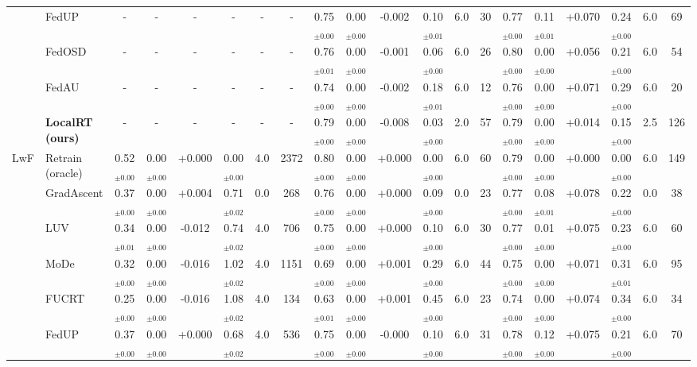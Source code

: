 \begin{table}[t]
\begin{tabular}{ll|cccccc|cccccc|cccccc}
 & FedUP & - & - & - & - & - & - & 0.75$_{\pm0.00}$ & 0.00$_{\pm0.00}$ & -0.002 & 0.10$_{\pm0.01}$ & 6.0 & 30 & 0.77$_{\pm0.00}$ & 0.11$_{\pm0.01}$ & +0.070 & 0.24$_{\pm0.00}$ & 6.0 & 69\\
 & FedOSD & - & - & - & - & - & - & 0.76$_{\pm0.01}$ & 0.00$_{\pm0.00}$ & -0.001 & 0.06$_{\pm0.00}$ & 6.0 & 26 & 0.80$_{\pm0.00}$ & 0.00$_{\pm0.00}$ & +0.056 & 0.21$_{\pm0.00}$ & 6.0 & 54\\
 & FedAU & - & - & - & - & - & - & 0.74$_{\pm0.00}$ & 0.00$_{\pm0.00}$ & -0.002 & 0.18$_{\pm0.01}$ & 6.0 & 12 & 0.76$_{\pm0.00}$ & 0.00$_{\pm0.00}$ & +0.071 & 0.29$_{\pm0.00}$ & 6.0 & 20\\
 & \textbf{LocalRT (ours)} & - & - & - & - & - & - & 0.79$_{\pm0.00}$ & 0.00$_{\pm0.00}$ & -0.008 & 0.03$_{\pm0.00}$ & 2.0 & 57 & 0.79$_{\pm0.00}$ & 0.00$_{\pm0.00}$ & +0.014 & 0.15$_{\pm0.00}$ & 2.5 & 126\\
\midrule
LwF & Retrain (oracle) & 0.52$_{\pm0.00}$ & 0.00$_{\pm0.00}$ & +0.000 & 0.00$_{\pm0.00}$ & 4.0 & 2372 & 0.80$_{\pm0.00}$ & 0.00$_{\pm0.00}$ & +0.000 & 0.00$_{\pm0.00}$ & 6.0 & 60 & 0.79$_{\pm0.00}$ & 0.00$_{\pm0.00}$ & +0.000 & 0.00$_{\pm0.00}$ & 6.0 & 149\\
 & GradAscent & 0.37$_{\pm0.00}$ & 0.00$_{\pm0.00}$ & +0.004 & 0.71$_{\pm0.02}$ & 0.0 & 268 & 0.76$_{\pm0.00}$ & 0.00$_{\pm0.00}$ & +0.000 & 0.09$_{\pm0.00}$ & 0.0 & 23 & 0.77$_{\pm0.00}$ & 0.08$_{\pm0.01}$ & +0.078 & 0.22$_{\pm0.00}$ & 0.0 & 38\\
 & LUV & 0.34$_{\pm0.01}$ & 0.00$_{\pm0.00}$ & -0.012 & 0.74$_{\pm0.02}$ & 4.0 & 706 & 0.75$_{\pm0.00}$ & 0.00$_{\pm0.00}$ & +0.000 & 0.10$_{\pm0.00}$ & 6.0 & 30 & 0.77$_{\pm0.00}$ & 0.01$_{\pm0.00}$ & +0.075 & 0.23$_{\pm0.00}$ & 6.0 & 60\\
 & MoDe & 0.32$_{\pm0.00}$ & 0.00$_{\pm0.00}$ & -0.016 & 1.02$_{\pm0.02}$ & 4.0 & 1151 & 0.69$_{\pm0.00}$ & 0.00$_{\pm0.00}$ & +0.001 & 0.29$_{\pm0.00}$ & 6.0 & 44 & 0.75$_{\pm0.00}$ & 0.00$_{\pm0.00}$ & +0.071 & 0.31$_{\pm0.01}$ & 6.0 & 95\\
 & FUCRT & 0.25$_{\pm0.00}$ & 0.00$_{\pm0.00}$ & -0.016 & 1.08$_{\pm0.02}$ & 4.0 & 134 & 0.63$_{\pm0.01}$ & 0.00$_{\pm0.00}$ & +0.001 & 0.45$_{\pm0.00}$ & 6.0 & 23 & 0.74$_{\pm0.00}$ & 0.00$_{\pm0.00}$ & +0.074 & 0.34$_{\pm0.00}$ & 6.0 & 34\\
 & FedUP & 0.37$_{\pm0.00}$ & 0.00$_{\pm0.00}$ & +0.000 & 0.68$_{\pm0.02}$ & 4.0 & 536 & 0.75$_{\pm0.00}$ & 0.00$_{\pm0.00}$ & -0.000 & 0.10$_{\pm0.00}$ & 6.0 & 31 & 0.78$_{\pm0.00}$ & 0.12$_{\pm0.00}$ & +0.075 & 0.21$_{\pm0.00}$ & 6.0 & 70\\

\end{tabular}
\end{table}
